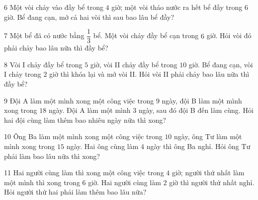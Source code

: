 \gap
\begin{probbox}{6}{\relax}
Một vòi chảy vào đầy bể trong $4$ giờ; một vòi tháo nước ra hết bể đầy trong $6$ giờ. Bể đang cạn, mở cả hai vòi thì sau bao lâu bể đầy?
\end{probbox}
\gap
\begin{probbox}{7}{\relax}
Một bể đã có nước bằng $\dfrac13$ bể. Một vòi chảy đầy bể cạn trong $6$ giờ. Hỏi vòi đó phải chảy bao lâu nữa thì đầy bể?
\end{probbox}
\gap
\begin{probbox}{8}{\relax}
Vòi I chảy đầy bể trong $5$ giờ, vòi II chảy đầy bể trong $10$ giờ. Bể đang cạn, vòi I chảy trong $2$ giờ thì khóa lại và mở vòi II. Hỏi vòi II phải chảy bao lâu nữa thì đầy bể?
\end{probbox}
\gap
\begin{probbox}{9}{\relax}
Đội A làm một mình xong một công việc trong $9$ ngày, đội B làm một mình xong trong $18$ ngày. Đội A làm một mình $3$ ngày, sau đó đội B đến làm cùng. Hỏi hai đội cùng làm thêm bao nhiêu ngày nữa thì xong?
\end{probbox}
\gap
\begin{probbox}{10}{\relax}
Ông Ba làm một mình xong một công việc trong $10$ ngày, ông Tư làm một mình xong trong $15$ ngày. Hai ông cùng làm $4$ ngày thì ông Ba nghỉ. Hỏi ông Tư phải làm bao lâu nữa thì xong?
\end{probbox}
\gap
\begin{probbox}{11}{\relax}
Hai người cùng làm thì xong một công việc trong $4$ giờ; người thứ nhất làm một mình thì xong trong $6$ giờ. Hai người cùng làm $2$ giờ thì người thứ nhất nghỉ. Hỏi người thứ hai phải làm thêm bao lâu nữa?
\end{probbox}
